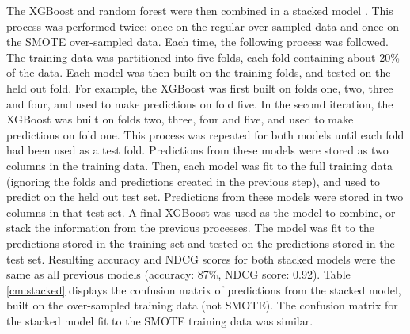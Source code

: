 \documentclass{article}
\begin{document}
The XGBoost and random forest were then combined in a stacked model \cite{BenGorman2016}. This process was performed twice: once on the regular over-sampled data and once on the SMOTE over-sampled data. Each time, the following process was followed. The training data was partitioned into five folds, each fold containing about 20\% of the data. Each model was then built on the training folds, and tested on the held out fold. For example, the XGBoost was first built on folds one, two, three and four, and used to make predictions on fold five. In the second iteration, the XGBoost was built on folds two, three, four and five, and used to make predictions on fold one. This process was repeated for both models until each fold had been used as a test fold. Predictions from these models were stored as two columns in the training data. Then, each model was fit to the full training data (ignoring the folds and predictions created in the previous step), and used to predict on the held out test set. Predictions from these models were stored in two columns in that test set. A final XGBoost was used as the model to combine, or stack the information from the previous processes. The model was fit to the predictions stored in the training set and tested on the predictions stored in the test set. Resulting accuracy and NDCG scores for both stacked models were the same as all previous models (accuracy: 87\%, NDCG score: 0.92). Table \ref{cm:stacked} displays the confusion matrix of predictions from the stacked model, built on the over-sampled training data (not SMOTE). The confusion matrix for the stacked model fit to the SMOTE training data was similar. 
\end{document}
